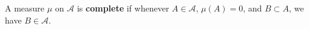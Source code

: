 A measure $\mu$ on $\mathcal{A}$ is \textbf{complete} if whenever $A \in \mathcal{A}$, $\mu(A) = 0$, and $B \subset A$, we have $B \in \mathcal{A}$.
